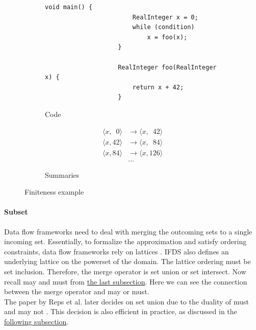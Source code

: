 \documentclass[../draft.tex]{subfiles}
\begin{document}
    \begin{figure}[ht]
        \centering
        \begin{subfigure}[b]{0.45\textwidth}
            \centering
            \begin{adjustbox}{max width=\columnwidth}
                \begin{lstlisting}[gobble=20, morekeywords={RealInteger}]
                    void main() {
                        RealInteger x = 0;
                        while (condition)
                            x = foo(x);
                    }
                    
                    RealInteger foo(RealInteger x) {
                        return x + 42;
                    }
                \end{lstlisting}
            \end{adjustbox}
            \caption{Code}
        \end{subfigure}
        \qquad
        \begin{subfigure}[b]{0.45\textwidth}
            \centering
            $$
                \begin{aligned}
                    \langle x, \phantom{0}0 \rangle &\rightarrow \langle x, \phantom{1}42 \rangle\\
                    \langle x, 42 \rangle &\rightarrow \langle x, \phantom{1}84 \rangle\\
                    \langle x, 84 \rangle &\rightarrow \langle x, 126 \rangle\\
                    &\dots
                \end{aligned}
            $$
            \caption{Summaries}
            \label{lst:ifdsfinite_b}
        \end{subfigure}
        \caption{Finiteness example}
        \label{lst:ifdsfinite}
    \end{figure}

    \paragraph{Subset} Data flow frameworks need to deal with merging the outcoming sets to a single incoming set. Essentially, to formalize the approximation and satisfy ordering constraints, data flow frameworks rely on lattices \cite{Khedker2009}. IFDS also defines an underlying lattice on the powerset of the domain. The lattice ordering must be set inclusion. Therefore, the merge operator is set union or set intersect. Now recall may and must from \hyperref[s:dataflow]{the last subsection}. Here we can see the connection between the merge operator and may or must.\\
    The paper by Reps et al. later decides on set union due to the duality of must and may not \cite{Reps1995}. This decision is also efficient in practice, as discussed in the \hyperref[s:ifdspractical]{following subsection}.
\end{document}
